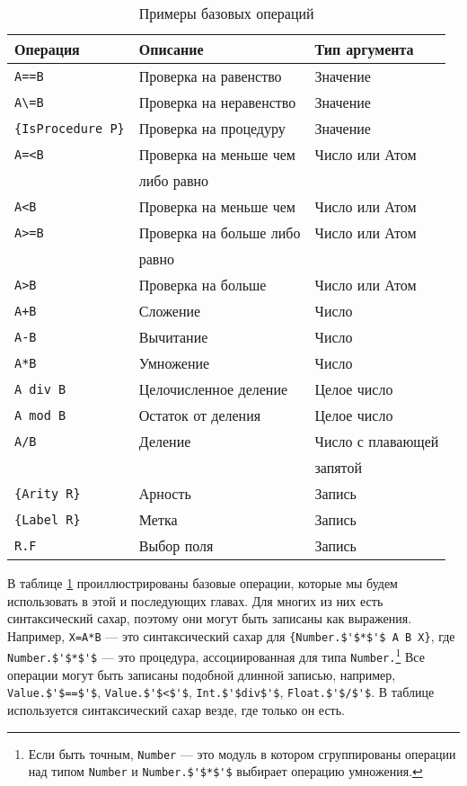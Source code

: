 \begin{table}
  \begin{tabular}{|lll|}
    \hline
    Операция & Описание & Тип аргумента\\
    \hline
    \lstinline|A==B| & Проверка на равенство & Значение\\
    \lstinline|A\=B| & Проверка на неравенство & Значение\\
    \lstinline|{IsProcedure P}| & Проверка на процедуру & Значение\\
    \lstinline|A=<B| & Проверка на меньше чем & Число или Атом\\
    & либо равно & \\
    \lstinline|A<B| & Проверка на меньше чем & Число или Атом\\
    \lstinline|A>=B| & Проверка на больше либо& Число или Атом\\
    & равно & \\
    \lstinline|A>B| & Проверка на больше & Число или Атом\\
    \lstinline|A+B| & Сложение & Число\\
    \lstinline|A-B| & Вычитание & Число\\
    \lstinline|A*B| & Умножение & Число\\
    \lstinline|A div B| & Целочисленное деление & Целое число\\
    \lstinline|A mod B| & Остаток от деления & Целое число\\
    \lstinline|A/B| & Деление & Число с плавающей\\
    & & запятой\\
    \lstinline|{Arity R}| & Арность & Запись\\
    \lstinline|{Label R}| & Метка & Запись\\
    \lstinline|R.F| & Выбор поля & Запись\\
    \hline
  \end{tabular}
  
\caption{Примеры базовых операций}
\label{table:examples_of_basic_operations}
\end{table}

В таблице \ref{table:examples_of_basic_operations} проиллюстрированы базовые операции, которые мы будем использовать в этой и последующих главах. Для многих из них есть синтаксический сахар, поэтому они могут быть записаны как выражения. Например, \lstinline|X=A*B| --- это синтаксический сахар для  \lstinline|{Number.$'$*$'$ A B X}|, где  \lstinline|Number.$'$*$'$|  --- это процедура, ассоциированная для типа \lstinline|Number.|\footnote{Если быть точным, \lstinline|Number| --- это модуль в котором сгруппированы операции над типом \lstinline|Number| и \lstinline|Number.$'$*$'$| выбирает операцию умножения.} Все операции могут быть записаны подобной длинной записью, например,  \lstinline|Value.$'$==$'$|, \lstinline|Value.$'$<$'$|, \lstinline|Int.$'$div$'$|, \lstinline|Float.$'$/$'$|. В таблице используется синтаксический сахар везде, где только он есть.

